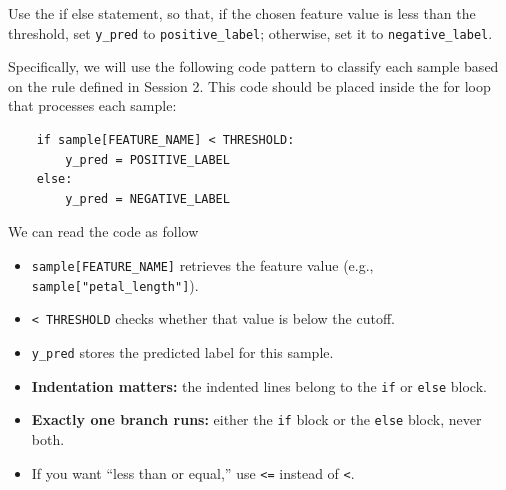 \begin{tcolorbox}[title=Task 4: Use an if-else statement to classify each sample based on the threshold rule]

Use the if else statement, so that, if the chosen feature value is less than the threshold, set \texttt{y\_pred} to \texttt{positive\_label}; otherwise, set it to \texttt{negative\_label}.
\end{tcolorbox}

Specifically, we will use the following code pattern to classify each sample based on the rule defined in Session 2. This code should be placed inside the for loop that processes each sample:
\begin{verbatim}
    if sample[FEATURE_NAME] < THRESHOLD:
        y_pred = POSITIVE_LABEL
    else:
        y_pred = NEGATIVE_LABEL
\end{verbatim}

We can read the code as follow
\begin{itemize}
  \item \texttt{sample[FEATURE\_NAME]} retrieves the feature value (e.g., \texttt{sample["petal\_length"]}).
  \item \texttt{< THRESHOLD} checks whether that value is below the cutoff.
  \item \texttt{y\_pred} stores the predicted label for this sample.
\end{itemize}

\begin{tcolorbox}[title=Common Mistakes]

\begin{itemize}
  \item \textbf{Indentation matters:} the indented lines belong to the \texttt{if} or \texttt{else} block.
  \item \textbf{Exactly one branch runs:} either the \texttt{if} block or the \texttt{else} block, never both.
  \item If you want ``less than or equal,'' use \texttt{<=} instead of \texttt{<}.
\end{itemize}
\end{tcolorbox}









